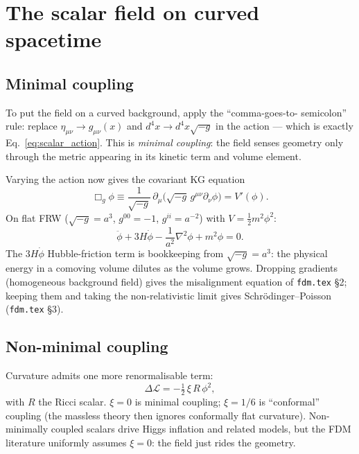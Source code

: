 \documentclass[12pt]{article}
\newcommand{\Lag}{\mathcal{L}}
\begin{document}
\section{The scalar field on curved spacetime}
\label{sec:curved}

\subsection{Minimal coupling}
\label{sec:minimal}

To put the field on a curved background, apply the ``comma-goes-to-
semicolon'' rule: replace $\eta_{\mu\nu} \to g_{\mu\nu}(x)$ and
$d^4x \to d^4x\sqrt{-g}$ in the action --- which is exactly
Eq.~\eqref{eq:scalar_action}.  This is \emph{minimal coupling}: the
field senses geometry only through the metric appearing in its
kinetic term and volume element.

Varying the action now gives the covariant KG equation
%
\begin{equation}
  \Box_g\phi \equiv \frac{1}{\sqrt{-g}}\,
    \partial_\mu\!\bigl(\sqrt{-g}\,g^{\mu\nu}\partial_\nu\phi\bigr)
    = V'(\phi).
  \label{eq:KG_covariant}
\end{equation}
%
On flat FRW ($\sqrt{-g} = a^3$, $g^{00}=-1$, $g^{ii}=a^{-2}$) with
$V = \tfrac{1}{2}m^2\phi^2$:
%
\begin{equation}
  \ddot\phi + 3H\dot\phi - \frac{1}{a^2}\nabla^2\phi + m^2\phi = 0.
  \label{eq:KG_FRW}
\end{equation}
%
The $3H\dot\phi$ Hubble-friction term is bookkeeping from
$\sqrt{-g}=a^3$: the physical energy in a comoving volume dilutes as
the volume grows.  Dropping gradients (homogeneous background field)
gives the misalignment equation of \texttt{fdm.tex} \S2; keeping them
and taking the non-relativistic limit gives Schr\"odinger--Poisson
(\texttt{fdm.tex} \S3).

\subsection{Non-minimal coupling}
\label{sec:nonminimal}

Curvature admits one more renormalisable term:
%
\begin{equation}
  \Delta\Lag = -\tfrac{1}{2}\,\xi\,R\,\phi^2,
\end{equation}
%
with $R$ the Ricci scalar.  $\xi = 0$ is minimal coupling;
$\xi = 1/6$ is ``conformal'' coupling (the massless theory then
ignores conformally flat curvature).  Non-minimally coupled scalars
drive Higgs inflation and related models, but the FDM literature
uniformly assumes $\xi = 0$: the field just rides the geometry.
\end{document}
